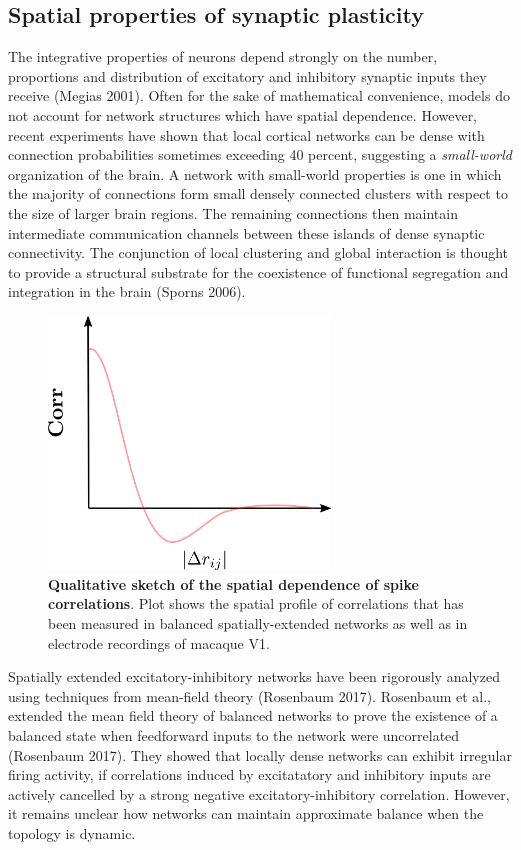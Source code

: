 \documentclass{ucetd}
\begin{document}
\subsection{Spatial properties of synaptic plasticity}

The integrative properties of neurons depend strongly on the number, proportions and distribution of excitatory and inhibitory synaptic inputs they receive (Megias 2001). Often for the sake of mathematical convenience, models do not account for network structures which have spatial dependence. However, recent experiments have shown that local cortical networks can be dense with connection probabilities sometimes exceeding 40 percent, suggesting a \emph{small-world} organization of the brain. A network with small-world properties is one in which the majority of connections form small densely connected clusters with respect to the size of larger brain regions. The remaining connections then maintain intermediate communication channels between these islands of dense synaptic connectivity. The conjunction of local clustering and global interaction is thought to provide a structural substrate for the coexistence of functional segregation and integration in the brain (Sporns 2006). 

\begin{figure}[t!]
\centering
\includegraphics[width=75mm]{figure-10}
\caption{\textbf{Qualitative sketch of the spatial dependence of spike correlations}. Plot shows the spatial profile of correlations that has been measured in balanced spatially-extended networks as well as in electrode recordings of macaque V1.}
\end{figure}

Spatially extended excitatory-inhibitory networks have been rigorously analyzed using techniques from mean-field theory (Rosenbaum 2017). Rosenbaum et al., extended the mean field theory of balanced networks to prove the existence of a balanced state when feedforward inputs to the network were uncorrelated (Rosenbaum 2017). They showed that locally dense networks can exhibit irregular firing activity, if correlations induced by excitatatory and inhibitory inputs are actively cancelled by a strong negative excitatory-inhibitory correlation. However, it remains unclear how networks can maintain approximate balance when the topology is dynamic.
\end{document}
